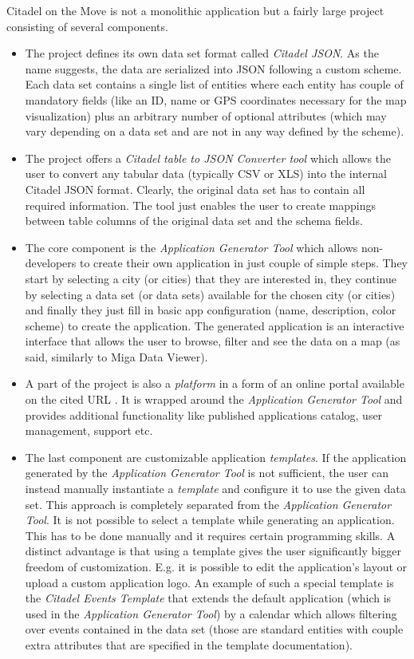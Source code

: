 Citadel on the Move is not a monolithic application but a fairly large project consisting of several components.

\begin{itemize}
\item The project defines its own data set format called \emph{Citadel JSON}. As the name suggests, the data are serialized into JSON following a custom scheme. Each data set contains a single list of entities where each entity has couple of mandatory fields (like an ID, name or GPS coordinates necessary for the map visualization) plus an arbitrary number of optional attributes (which may vary depending on a data set and are not in any way defined by the scheme). 
\item The project offers a \emph{Citadel table to JSON Converter tool} which allows the user to convert any tabular data (typically CSV or XLS) into the internal {Citadel JSON} format. Clearly, the original data set has to contain all required information. The tool just enables the user to create mappings between table columns of the original data set and the schema fields.
\item The core component is the \emph{Application Generator Tool} which allows non-developers to create their own application in just couple of simple steps. They start by selecting a city (or cities) that they are interested in, they continue by selecting a data set (or data sets) available for the chosen city (or cities) and finally they just fill in basic app configuration (name, description, color scheme) to create the application. The generated application is an interactive interface that allows the user to browse, filter and see the data on a map (as said, similarly to Miga Data Viewer).
\item A part of the project is also a \emph{platform} in a form of an online portal available on the cited URL \cite{citadel_home}. It is wrapped around the  \emph{Application Generator Tool} and provides additional functionality like published applications catalog, user management, support etc.
\item The last component are customizable application \emph{templates}. If the application generated by the \emph{Application Generator Tool} is not sufficient, the user can instead manually instantiate a \emph{template} and configure it to use the given data set. This approach is completely separated from the \emph{Application Generator Tool}. It is not possible to select a template while generating an application. This has to be done manually and it requires certain programming skills. A distinct advantage is that using a template gives the user significantly bigger freedom of customization. E.g. it is possible to edit the application's layout or upload a custom application logo. An example of such a special template is the \emph{Citadel Events Template} that extends the default application (which is used in the \emph{Application Generator Tool}) by a calendar which allows filtering over events contained in the data set (those are standard entities with couple extra attributes that are specified in the template documentation).
\end{itemize}

